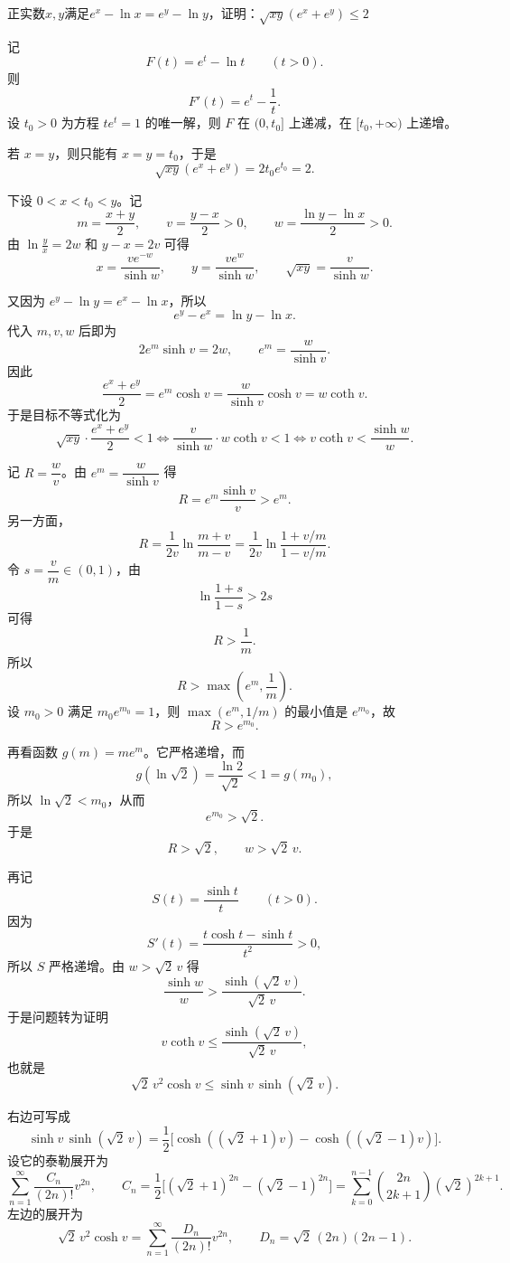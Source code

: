 \begin{example}[指数放缩题]
    正实数$x,y$满足$e^x-\ln x=e^y-\ln y$，证明：$\sqrt{xy}\left(e^x+e^y\right)\leqslant2$
\end{example}
\begin{solution}
记
$$ F(t)=e^t-\ln t \qquad (t>0). $$
则
$$ F'(t)=e^t-\frac1t. $$
设 $t_0>0$ 为方程 $t e^t=1$ 的唯一解，则 $F$ 在 $(0,t_0]$ 上递减，在 $[t_0,+\infty)$ 上递增。

若 $x=y$，则只能有 $x=y=t_0$，于是
$$ \sqrt{xy}(e^x+e^y)=2t_0e^{t_0}=2. $$

下设 $0<x<t_0<y$。记
$$ m=\frac{x+y}{2},\qquad v=\frac{y-x}{2}>0,\qquad w=\frac{\ln y-\ln x}{2}>0. $$
由 $\ln\frac{y}{x}=2w$ 和 $y-x=2v$ 可得
$$ x=\frac{v e^{-w}}{\sinh w},\qquad y=\frac{v e^w}{\sinh w},\qquad \sqrt{xy}=\frac{v}{\sinh w}. $$

又因为 $e^y-\ln y=e^x-\ln x$，所以
$$ e^y-e^x=\ln y-\ln x. $$
代入 $m,v,w$ 后即为
$$ 2e^m\sinh v=2w,\qquad e^m=\frac{w}{\sinh v}. $$
因此
$$ \frac{e^x+e^y}{2}=e^m\cosh v=\frac{w}{\sinh v}\cosh v=w\coth v. $$
于是目标不等式化为
\[
\sqrt{xy}\cdot\frac{e^x+e^y}{2}<1
\iff
\frac{v}{\sinh w}\cdot w\coth v<1
\iff
v\coth v<\frac{\sinh w}{w}.
\]

记 $R=\dfrac{w}{v}$。由 $e^m=\dfrac{w}{\sinh v}$ 得
$$ R=e^m\frac{\sinh v}{v}>e^m. $$
另一方面，
$$ R=\frac{1}{2v}\ln\frac{m+v}{m-v}=\frac{1}{2v}\ln\frac{1+v/m}{1-v/m}. $$
令 $s=\dfrac{v}{m}\in(0,1)$，由
$$ \ln\frac{1+s}{1-s}>2s $$
可得
$$ R>\frac1m. $$
所以
$$ R>\max\left(e^m,\frac1m\right). $$
设 $m_0>0$ 满足 $m_0e^{m_0}=1$，则 $\max(e^m,1/m)$ 的最小值是 $e^{m_0}$，故
$$ R>e^{m_0}. $$

再看函数 $g(m)=me^m$。它严格递增，而
$$ g(\ln\sqrt2)=\frac{\ln2}{\sqrt2}<1=g(m_0), $$
所以 $\ln\sqrt2<m_0$，从而
$$ e^{m_0}>\sqrt2. $$
于是
$$ R>\sqrt2,\qquad w>\sqrt2\,v. $$

再记
$$ S(t)=\frac{\sinh t}{t}\qquad (t>0). $$
因为
$$ S'(t)=\frac{t\cosh t-\sinh t}{t^2}>0, $$
所以 $S$ 严格递增。由 $w>\sqrt2\,v$ 得
$$ \frac{\sinh w}{w}>\frac{\sinh(\sqrt2\,v)}{\sqrt2\,v}. $$
于是问题转为证明
$$ v\coth v\le \frac{\sinh(\sqrt2\,v)}{\sqrt2\,v}, $$
也就是
$$ \sqrt2\,v^2\cosh v\le \sinh v\,\sinh(\sqrt2\,v). $$

右边可写成
$$ \sinh v\,\sinh(\sqrt2\,v)=\frac12\bigl[\cosh((\sqrt2+1)v)-\cosh((\sqrt2-1)v)\bigr]. $$
设它的泰勒展开为
$$ \sum_{n=1}^{\infty}\frac{C_n}{(2n)!}v^{2n},\qquad
C_n=\frac12\bigl[(\sqrt2+1)^{2n}-(\sqrt2-1)^{2n}\bigr]
=\sum_{k=0}^{n-1}\binom{2n}{2k+1}(\sqrt2)^{2k+1}. $$
左边的展开为
$$ \sqrt2\,v^2\cosh v
=\sum_{n=1}^{\infty}\frac{D_n}{(2n)!}v^{2n},\qquad
D_n=\sqrt2\,(2n)(2n-1). $$


\end{solution}
